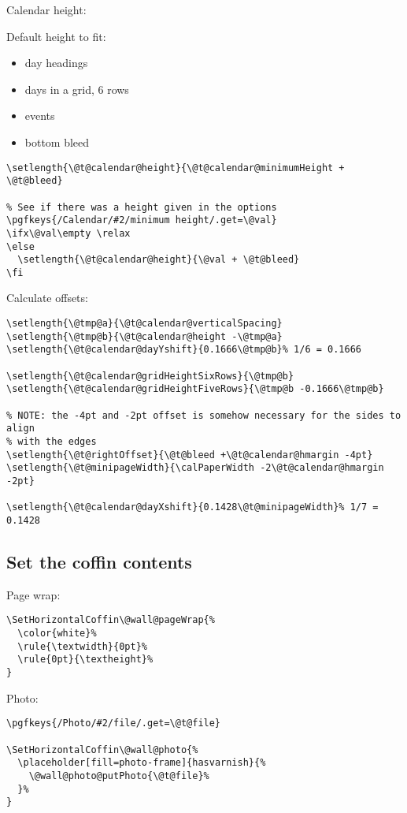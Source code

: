 \documentclass[11pt,oneside]{memoir-article}
\begin{document}
Calendar height:

Default height to fit:

\begin{itemize}
\item day headings
\item days in a grid, 6 rows
\item events
\item bottom bleed
\end{itemize}

\begin{verbatim}
\setlength{\@t@calendar@height}{\@t@calendar@minimumHeight + \@t@bleed}

% See if there was a height given in the options
\pgfkeys{/Calendar/#2/minimum height/.get=\@val}
\ifx\@val\empty \relax
\else
  \setlength{\@t@calendar@height}{\@val + \@t@bleed}
\fi
\end{verbatim}

Calculate offsets:

\begin{verbatim}
\setlength{\@tmp@a}{\@t@calendar@verticalSpacing}
\setlength{\@tmp@b}{\@t@calendar@height -\@tmp@a}
\setlength{\@t@calendar@dayYshift}{0.1666\@tmp@b}% 1/6 = 0.1666

\setlength{\@t@calendar@gridHeightSixRows}{\@tmp@b}
\setlength{\@t@calendar@gridHeightFiveRows}{\@tmp@b -0.1666\@tmp@b}

% NOTE: the -4pt and -2pt offset is somehow necessary for the sides to align
% with the edges
\setlength{\@t@rightOffset}{\@t@bleed +\@t@calendar@hmargin -4pt}
\setlength{\@t@minipageWidth}{\calPaperWidth -2\@t@calendar@hmargin -2pt}

\setlength{\@t@calendar@dayXshift}{0.1428\@t@minipageWidth}% 1/7 = 0.1428
\end{verbatim}

\subsection{Set the coffin contents}
\label{sec:org83e829f}

Page wrap:

\begin{verbatim}
\SetHorizontalCoffin\@wall@pageWrap{%
  \color{white}%
  \rule{\textwidth}{0pt}%
  \rule{0pt}{\textheight}%
}
\end{verbatim}

Photo:

\begin{verbatim}
\pgfkeys{/Photo/#2/file/.get=\@t@file}

\SetHorizontalCoffin\@wall@photo{%
  \placeholder[fill=photo-frame]{hasvarnish}{%
    \@wall@photo@putPhoto{\@t@file}%
  }%
}
\end{verbatim}
\end{document}
